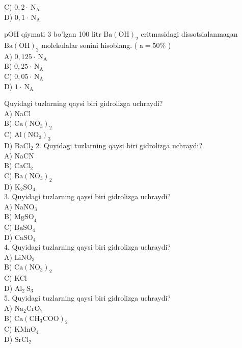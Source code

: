C) $0,2 \cdot \mathrm{~N}_{\mathrm{A}}$\\
D) $0,1 \cdot \mathrm{~N}_{\mathrm{A}}$
  \item pOH qiymati 3 bo'lgan 100 litr $\mathrm{Ba}(\mathrm{OH})_{2}$ eritmasidagi dissotsialanmagan $\mathrm{Ba}(\mathrm{OH})_{2}$ molekulalar sonini hisoblang. ( $\mathrm{a}=50 \%$ )\\
A) $0,125 \cdot \mathrm{~N}_{\mathrm{A}}$\\
B) $0,25 \cdot \mathrm{~N}_{\mathrm{A}}$\\
C) $0,05 \cdot \mathrm{~N}_{\mathrm{A}}$\\
D) $1 \cdot \mathrm{~N}_{\mathrm{A}}$
  \item Quyidagi tuzlarning qaysi biri gidrolizga uchraydi?\\
A) NaCl\\
B) $\mathrm{Ca}\left(\mathrm{NO}_{3}\right)_{2}$\\
C) $\mathrm{Al}\left(\mathrm{NO}_{3}\right)_{3}$\\
D) $\mathrm{BaCl}_{2}$
2. Quyidagi tuzlarning qaysi biri gidrolizga uchraydi?\\
A) NaCN\\
B) $\mathrm{CaCl}_{2}$\\
C) $\mathrm{Ba}\left(\mathrm{NO}_{3}\right)_{2}$\\
D) $\mathrm{K}_{2} \mathrm{SO}_{4}$\\
3. Quyidagi tuzlarning qaysi biri gidrolizga uchraydi?\\
A) $\mathrm{NaNO}_{3}$\\
B) $\mathrm{MgSO}_{4}$\\
C) $\mathrm{BaSO}_{4}$\\
D) $\mathrm{CaSO}_{4}$\\
4. Quyidagi tuzlarning qaysi biri gidrolizga uchraydi?\\
A) $\mathrm{LiNO}_{3}$\\
B) $\mathrm{Ca}\left(\mathrm{NO}_{3}\right)_{2}$\\
C) KCl\\
D) $\mathrm{Al}_{2} \mathrm{~S}_{3}$\\
5. Quyidagi tuzlarning qaysi biri gidrolizga uchraydi?\\
A) $\mathrm{Na}_{2} \mathrm{CrO}_{7}$\\
B) $\mathrm{Ca}\left(\mathrm{CH}_{3} \mathrm{COO}\right)_{2}$\\
C) $\mathrm{KMnO}_{4}$\\
D) $\mathrm{SrCl}_{2}$\\
